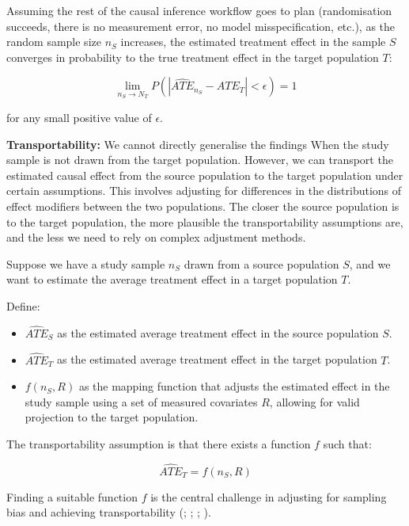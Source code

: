 \documentclass[
  single column]{article}
\providecommand{\tightlist}{%
  \setlength{\itemsep}{0pt}\setlength{\parskip}{0pt}}\usepackage{longtable,booktabs,array}
\begin{document}
Assuming the rest of the causal inference workflow goes to plan
(randomisation succeeds, there is no measurement error, no model
misspecification, etc.), as the random sample size \(n_S\) increases,
the estimated treatment effect in the sample \(S\) converges in
probability to the true treatment effect in the target population \(T\):

\[
\lim_{n_S \to N_T} P(|\widehat{ATE}_{n_S} - ATE_{T}| < \epsilon) = 1
\]

for any small positive value of \(\epsilon\).

\textbf{Transportability:} We cannot directly generalise the findings
When the study sample is not drawn from the target population. However,
we can transport the estimated causal effect from the source population
to the target population under certain assumptions. This involves
adjusting for differences in the distributions of effect modifiers
between the two populations. The closer the source population is to the
target population, the more plausible the transportability assumptions
are, and the less we need to rely on complex adjustment methods.

Suppose we have a study sample \(n_S\) drawn from a source population
\(S\), and we want to estimate the average treatment effect in a target
population \(T\).

Define:

\begin{itemize}
\tightlist
\item
  \(\widehat{ATE}_{S}\) as the estimated average treatment effect in the
  source population \(S\).
\item
  \(\widehat{ATE}_{T}\) as the estimated average treatment effect in the
  target population \(T\).
\item
  \(f(n_S, R)\) as the mapping function that adjusts the estimated
  effect in the study sample using a set of measured covariates \(R\),
  allowing for valid projection to the target population.
\end{itemize}

The transportability assumption is that there exists a function \(f\)
such that:

\[
\widehat{ATE}_{T} = f(n_S, R)
\]

Finding a suitable function \(f\) is the central challenge in adjusting
for sampling bias and achieving transportability
(;
;
;
).
\end{document}
